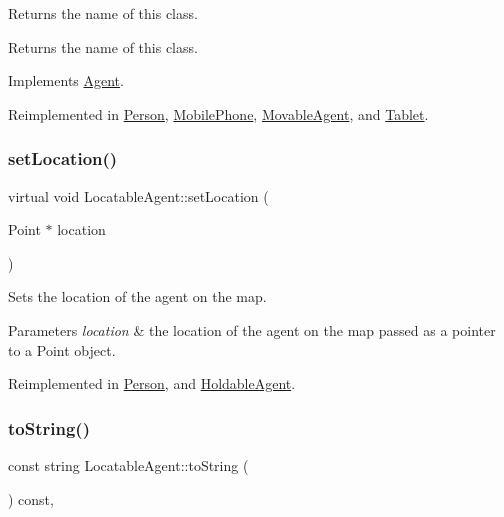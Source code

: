 Returns the name of this class. \begin{DoxyReturn}{Returns}
the name of this class. 
\end{DoxyReturn}


Implements \hyperlink{class_agent_afe6c72d91baf9ee4fe77ea1ed7fef3ba}{Agent}.



Reimplemented in \hyperlink{class_person_aa2a6f8d7f1d94045a03ca578f2ed272c}{Person}, \hyperlink{class_mobile_phone_a1eeac3141baafa75ebcf26fc3a0e4068}{Mobile\+Phone}, \hyperlink{class_movable_agent_abcc1218876c39c996f2cb1eba2b96379}{Movable\+Agent}, and \hyperlink{class_tablet_adc7196aaee1e9714236b7cd8825d5826}{Tablet}.

\mbox{\label{class_locatable_agent_a754b237c404b77714fedd397f214bc02}} 
\subsubsection{\texorpdfstring{set\+Location()}{setLocation()}}
{\footnotesize\ttfamily virtual void Locatable\+Agent\+::set\+Location (\begin{DoxyParamCaption}\item[{Point $\ast$}]{location }\end{DoxyParamCaption})\hspace{0.3cm}{\ttfamily [virtual]}}

Sets the location of the agent on the map. 
\begin{DoxyParams}{Parameters}
{\em location} & the location of the agent on the map passed as a pointer to a Point object. \\
\hline
\end{DoxyParams}


Reimplemented in \hyperlink{class_person_a05f4ac2107d59e03f0f336eda08aa358}{Person}, and \hyperlink{class_holdable_agent_aec98d2fe325b48d9a84ad3dad44700e0}{Holdable\+Agent}.

\mbox{\label{class_locatable_agent_a88674f4c8ab9b1b2f3986b226bf4244f}} 
\subsubsection{\texorpdfstring{to\+String()}{toString()}}
{\footnotesize\ttfamily const string Locatable\+Agent\+::to\+String (\begin{DoxyParamCaption}{ }\end{DoxyParamCaption}) const\hspace{0.3cm}{\ttfamily [override]}, {\ttfamily [virtual]}}


